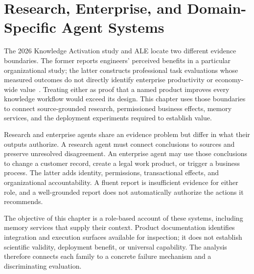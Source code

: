\chapter{Research, Enterprise, and Domain-Specific Agent Systems}\label{ch:C24}
The 2026 Knowledge Activation study and ALE locate two different evidence boundaries. The former reports engineers' perceived benefits in a particular organizational study; the latter constructs professional task evaluations whose measured outcomes do not directly identify enterprise productivity or economy-wide value~\cite{corpus260314805,corpus260605405}. Treating either as proof that a named product improves every knowledge workflow would exceed its design. This chapter uses those boundaries to connect source-grounded research, permissioned business effects, memory services, and the deployment experiments required to establish value.

Research and enterprise agents share an evidence problem but differ in what their outputs authorize. A research agent must connect conclusions to sources and preserve unresolved disagreement. An enterprise agent may use those conclusions to change a customer record, create a legal work product, or trigger a business process. The latter adds identity, permissions, transactional effects, and organizational accountability. A fluent report is insufficient evidence for either role, and a well-grounded report does not automatically authorize the actions it recommends.

The objective of this chapter is a role-based account of these systems, including memory services that supply their context. Product documentation identifies integration and execution surfaces available for inspection; it does not establish scientific validity, deployment benefit, or universal capability. The analysis therefore connects each family to a concrete failure mechanism and a discriminating evaluation.









